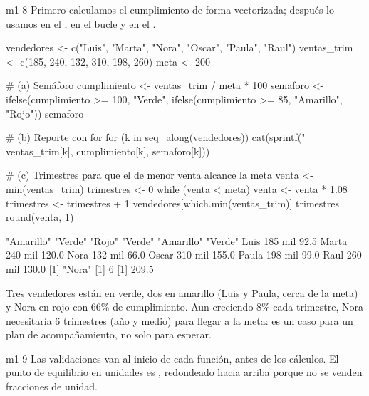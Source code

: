 \begin{solucion}{m1-8}
Primero calculamos el cumplimiento de forma vectorizada; después lo usamos
en el , en el bucle y en el .
\end{solucion}

\begin{rcode}
vendedores <- c("Luis", "Marta", "Nora", "Oscar", "Paula", "Raul")
ventas_trim <- c(185, 240, 132, 310, 198, 260)
meta <- 200

# (a) Semáforo
cumplimiento <- ventas_trim / meta * 100
semaforo <- ifelse(cumplimiento >= 100, "Verde",
                   ifelse(cumplimiento >= 85, "Amarillo", "Rojo"))
semaforo

# (b) Reporte con for
for (k in seq_along(vendedores)) {
  cat(sprintf("%
              ventas_trim[k], cumplimiento[k], semaforo[k]))
}

# (c) Trimestres para que el de menor venta alcance la meta
venta <- min(ventas_trim)
trimestres <- 0
while (venta < meta) {
  venta <- venta * 1.08
  trimestres <- trimestres + 1
}
vendedores[which.min(ventas_trim)]
trimestres
round(venta, 1)
\end{rcode}
\begin{rsalida}
[1] "Amarillo" "Verde"    "Rojo"     "Verde"    "Amarillo" "Verde"   
Luis    185 mil    92.5%
Marta   240 mil   120.0%
Nora    132 mil    66.0%
Oscar   310 mil   155.0%
Paula   198 mil    99.0%
Raul    260 mil   130.0%
[1] "Nora"
[1] 6
[1] 209.5
\end{rsalida}

Tres vendedores están en verde, dos en amarillo (Luis y Paula, cerca de la
meta) y Nora en rojo con 66\% de cumplimiento. Aun creciendo 8\% cada
trimestre, Nora necesitaría 6 trimestres (año y medio) para llegar a la
meta: es un caso para un plan de acompañamiento, no solo para esperar.


\begin{solucion}{m1-9}
Las validaciones van al inicio de cada función, antes de los cálculos. El
punto de equilibrio en unidades es
, redondeado hacia
arriba porque no se venden fracciones de unidad.
\end{solucion}


